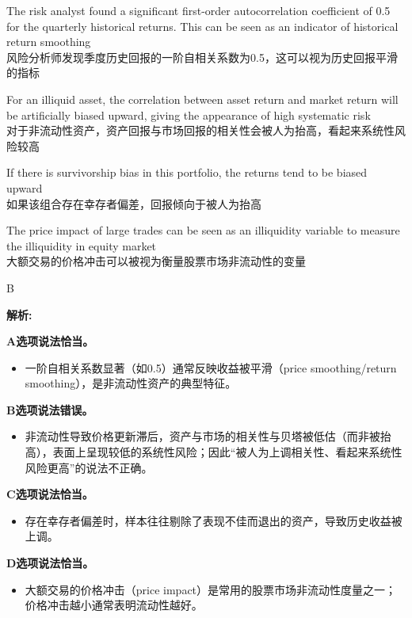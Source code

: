 \documentclass{article}
\newenvironment{explanation}
{\textbf{解析:}\par}
{\par}
\begin{document}
\begin{choices}
    \item The risk analyst found a significant first-order autocorrelation coefficient of 0.5 for the quarterly historical returns. This can be seen as an indicator of historical return smoothing\\
    风险分析师发现季度历史回报的一阶自相关系数为0.5，这可以视为历史回报平滑的指标
    \item For an illiquid asset, the correlation between asset return and market return will be artificially biased upward, giving the appearance of high systematic risk\\
    对于非流动性资产，资产回报与市场回报的相关性会被人为抬高，看起来系统性风险较高
    \item If there is survivorship bias in this portfolio, the returns tend to be biased upward\\
    如果该组合存在幸存者偏差，回报倾向于被人为抬高
    \item The price impact of large trades can be seen as an illiquidity variable to measure the illiquidity in equity market\\
    大额交易的价格冲击可以被视为衡量股票市场非流动性的变量
\end{choices}

\begin{correctanswer}
    B
\end{correctanswer}

\begin{explanation}
    \textbf{A选项说法恰当。}
    \begin{itemize}
        \item 一阶自相关系数显著（如0.5）通常反映收益被平滑（price smoothing/return smoothing），是非流动性资产的典型特征。
    \end{itemize}

    \textbf{B选项说法错误。}
    \begin{itemize}
        \item 非流动性导致价格更新滞后，资产与市场的相关性与贝塔被低估（而非被抬高），表面上呈现较低的系统性风险；因此“被人为上调相关性、看起来系统性风险更高”的说法不正确。
    \end{itemize}

    \textbf{C选项说法恰当。}
    \begin{itemize}
        \item 存在幸存者偏差时，样本往往剔除了表现不佳而退出的资产，导致历史收益被上调。
    \end{itemize}

    \textbf{D选项说法恰当。}
    \begin{itemize}
        \item 大额交易的价格冲击（price impact）是常用的股票市场非流动性度量之一；价格冲击越小通常表明流动性越好。
    \end{itemize}
\end{explanation}
\end{document}
